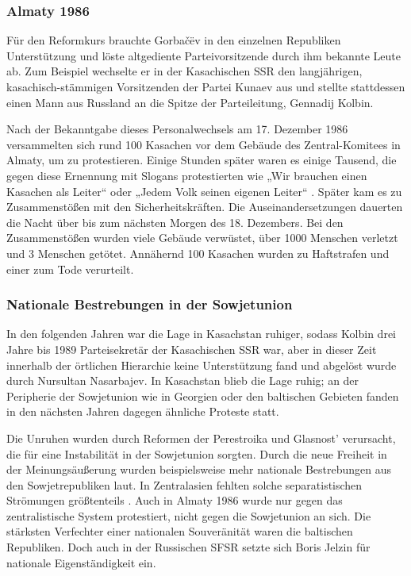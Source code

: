 \documentclass{../../sem_paper}
\begin{document}
\subsubsection{Almaty 1986}
Für den Reformkurs brauchte Gorbačëv in den einzelnen Republiken Unterstützung
und löste altgediente Parteivorsitzende durch ihm bekannte Leute ab. Zum Beispiel
wechselte er in der Kasachischen SSR den langjährigen, kasachisch-stämmigen
Vorsitzenden der Partei Kunaev aus und stellte stattdessen einen Mann aus Russland an
die Spitze der Parteileitung, Gennadij Kolbin.

Nach der Bekanntgabe dieses Personalwechsels am 17. Dezember 1986
versammelten sich rund 100 Kasachen vor dem Gebäude des Zentral-Komitees in
Almaty, um zu protestieren. Einige Stunden später waren es einige Tausend, die gegen
diese Ernennung mit Slogans protestierten wie „Wir brauchen einen Kasachen als
Leiter“ oder „Jedem Volk seinen eigenen Leiter“ \autocite{trut1994} . Später kam es zu Zusammenstößen
mit den Sicherheitskräften. Die Auseinandersetzungen dauerten die Nacht über bis zum
nächsten Morgen des 18. Dezembers. Bei den Zusammenstößen wurden viele Gebäude
verwüstet, über 1000 Menschen verletzt und 3 Menschen getötet. Annähernd 100
Kasachen wurden zu Haftstrafen und einer zum Tode verurteilt.

\subsubsection{Nationale Bestrebungen in der Sowjetunion}
In den folgenden Jahren war die Lage in Kasachstan ruhiger, sodass Kolbin drei
Jahre bis 1989 Parteisekretär der Kasachischen SSR war, aber in dieser Zeit innerhalb der
örtlichen Hierarchie keine Unterstützung fand und abgelöst wurde durch Nursultan
Nasarbajev. In Kasachstan blieb die Lage ruhig; an der Peripherie der
Sowjetunion wie in Georgien oder den baltischen Gebieten fanden in den nächsten
Jahren dagegen ähnliche Proteste statt.

Die Unruhen wurden durch Reformen der Perestroika und Glasnost' verursacht, die
für eine Instabilität in der Sowjetunion sorgten. Durch die neue Freiheit in der
Meinungsäußerung wurden beispielsweise mehr nationale Bestrebungen aus den
Sowjetrepubliken laut. In Zentralasien fehlten solche separatistischen Strömungen
größtenteils \autocite[43]{zaslav1991}. Auch in Almaty 1986 wurde nur gegen das zentralistische System
protestiert, nicht gegen die Sowjetunion an sich. Die stärksten Verfechter einer
nationalen Souveränität waren die baltischen Republiken. Doch auch in der Russischen
SFSR setzte sich Boris Jelzin für nationale Eigenständigkeit ein.
\end{document}
